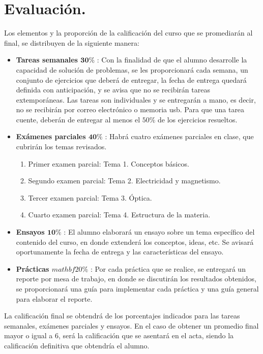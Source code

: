\documentclass[12pt]{article}
\begin{document}
\section{Evaluación.}
Los elementos y la proporción de la calificación del curso que se promediarán al final, se distribuyen de la siguiente manera:
\begin{itemize}
\item \textbf{Tareas semanales $\mathbf{30\%}$} : Con la finalidad de que el alumno desarrolle la capacidad de solución de problemas, se les proporcionará cada semana, un conjunto de ejercicios que deberá de entregar, la fecha de entrega quedará definida con anticipación, y se avisa que no se recibirán tareas extemporáneas. Las tareas son individuales y se entregarán a mano, es decir, no se recibirán por correo electrónico o memoria usb. Para que una tarea cuente, deberán de entregar al menos el $50\%$ de los ejercicios resueltos. 
\item \textbf{Exámenes parciales $\mathbf{40\%}$} : Habrá cuatro exámenes parciales en clase, que cubrirán los temas revisados.
\begin{enumerate}
\item Primer examen parcial: Tema 1. Conceptos básicos.
\item Segundo examen parcial: Tema 2. Electricidad y magnetismo.
\item Tercer examen parcial: Tema 3. Óptica.
\item Cuarto examen parcial: Tema 4. Estructura de la materia. 
\end{enumerate}
\item \textbf{Ensayos $\mathbf{10\%}$} : El alumno elaborará un ensayo sobre un tema específico del contenido del curso, en donde extenderá los conceptos, ideas, etc. Se avisará oportunamente la fecha de entrega y las características del ensayo.
\item \textbf{Prácticas $mathbf{20\%}$} : Por cada práctica que se realice, se entregará un reporte por mesa de trabajo, en donde se discutirán los resultados obtenidos, se proporcionará una guía para implementar cada práctica y una guía general para elaborar el reporte.
\end{itemize}
La calificación final se obtendrá de los porcentajes indicados para las tareas semanales, exámenes parciales y ensayos. En el caso de obtener un promedio final mayor o igual a $6$, será la calificación que se asentará en el acta, siendo la calificación definitiva que obtendría el alumno.
\end{document}
